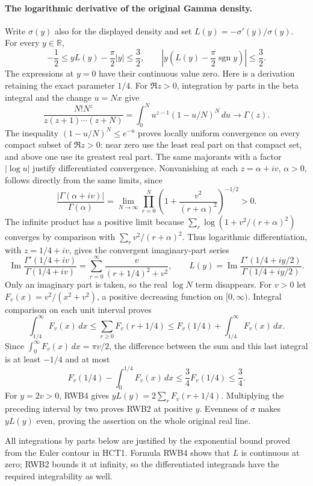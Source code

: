\paragraph{The logarithmic derivative of the original Gamma density.}
Write $\sigma(y)$ also for the displayed density and set
$L(y)=-\sigma'(y)/\sigma(y)$. For every $y\in\mathbb R$,
\[
 -\frac12\le yL(y)-\frac\pi2|y|\le\frac32,
 \qquad
 \left|y\left(L(y)-\frac\pi2\operatorname{sgn}y\right)\right|
 \le\frac32.
 \tag{RWB2}
\]
The expressions at $y=0$ have their continuous value zero. Here is a
derivation retaining the exact parameter $1/4$. For $\Re z>0$,
integration by parts in the beta integral and the change $u=Nx$ give
\[
 \frac{N!N^z}{z(z+1)\cdots(z+N)}
 =\int_0^N u^{z-1}(1-u/N)^N\,du\longrightarrow\Gamma(z).
 \tag{RWB3}
\]
The inequality $(1-u/N)^N\le e^{-u}$ proves locally uniform convergence
on every compact subset of $\Re z>0$: near zero use the least real part
on that compact set, and above one use its greatest real part. The same
majorants with a factor $|\log u|$ justify differentiated convergence.
Nonvanishing at each $z=\alpha+iv$, $\alpha>0$, follows directly from
the same limits, since
\[
 \frac{|\Gamma(\alpha+iv)|}{\Gamma(\alpha)}
 =\lim_{N\to\infty}\prod_{r=0}^N
       \left(1+\frac{v^2}{(r+\alpha)^2}\right)^{-1/2}>0.
\]
The infinite product has a positive limit because
$\sum_r\log(1+v^2/(r+\alpha)^2)$ converges by comparison with
$\sum_r v^2/(r+\alpha)^2$. Thus logarithmic differentiation, with
$z=1/4+iv$, gives the convergent imaginary-part series
\[
 \operatorname{Im}\frac{\Gamma'(1/4+iv)}{\Gamma(1/4+iv)}
 =\sum_{r=0}^{\infty}\frac{v}{(r+1/4)^2+v^2},
 \qquad L(y)=\operatorname{Im}\frac{\Gamma'(1/4+iy/2)}{
                                  \Gamma(1/4+iy/2)}.
 \tag{RWB4}
\]
Only an imaginary part is taken, so the real $\log N$ term disappears.
For $v>0$ let $F_v(x)=v^2/(x^2+v^2)$, a positive decreasing function
on $[0,\infty)$. Integral comparison on each unit interval proves
\[
 \int_{1/4}^{\infty}F_v(x)\,dx
 \le\sum_{r\ge0}F_v(r+1/4)
 \le F_v(1/4)+\int_{1/4}^{\infty}F_v(x)\,dx.
\]
Since $\int_0^\infty F_v(x)\,dx=\pi v/2$, the difference between
the sum and this last integral is at least $-1/4$ and at most
\[
 F_v(1/4)-\int_0^{1/4}F_v(x)\,dx
 \le\frac34F_v(1/4)\le\frac34.
\]
For $y=2v>0$, RWB4 gives $yL(y)=2\sum_r F_v(r+1/4)$.
Multiplying the preceding interval by two proves RWB2 at positive $y$.
Evenness of $\sigma$ makes $yL(y)$ even, proving the assertion on the
whole original real line.

All integrations by parts below are justified by the exponential bound
proved from the Euler contour in HCT1. Formula RWB4 shows that $L$ is
continuous at zero; RWB2 bounds it at infinity, so the differentiated
integrands have the required integrability as well.

